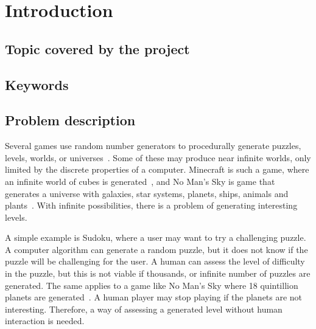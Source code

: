 \chapter{Introduction}
\label{chap:introduction}

\section{Topic covered by the project}

\section{Keywords}

\section{Problem description}
\label{sec:ProblemDescription}
Several games use random number generators to procedurally generate puzzles, levels, worlds, or universes~\cite{Hendrikx2013}.
Some of these may produce near infinite worlds, only limited by the discrete properties of a computer.
Minecraft is such a game, where an infinite world of cubes is generated~\cite{Minecraft:Website}, and No Man's Sky is game that generates a universe with galaxies, star systems, planets, ships, animals and plants~\cite{NMS:Website}.
With infinite possibilities, there is a problem of generating interesting levels.

A simple example is Sudoku, where a user may want to try a challenging puzzle.
A computer algorithm can generate a random puzzle, but it does not know if the puzzle will be challenging for the user.
A human can assess the level of difficulty in the puzzle, but this is not viable if thousands, or infinite number of puzzles are generated.
The same applies to a game like No Man's Sky where 18 quintillion planets are generated~\cite{NMS:Size}.
A human player may stop playing if the planets are not interesting. Therefore, a way of assessing a generated level without human interaction is needed.






